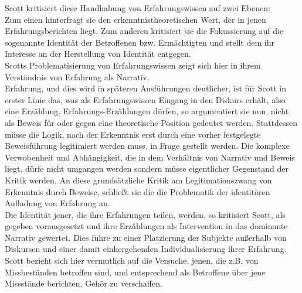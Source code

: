 \noindent Scott kritisiert diese Handhabung von Erfahrungswissen auf zwei Ebenen:\\
 Zum
einen hinterfragt sie den erkenntnistheoretischen Wert, der in jenen
Erfahrungsberichten liegt. Zum anderen kritisiert sie die Fokussierung auf die
sogenannte Identität der Betroffenen bzw. Ermächtigten und stellt dem ihr
Interesse an der Herstellung von Identität entgegen.\footnotemark{}\\
Scotts Problematisierung
von Erfahrungswissen zeigt sich hier in ihrem Verständnis von Erfahrung als
Narrativ.\\
 Erfahrung, und dies wird in späteren Ausführungen deutlicher, ist für
Scott in erster Linie das, was als Erfahrungswissen Eingang in den Diskurs
erhält, also eine Erzählung. Erfahrungs-Erzählungen dürfen, so argumentiert sie
nun, nicht als Beweis für oder gegen eine theoretische Position gedeutet
werden. Stattdessen müsse die Logik, nach der Erkenntnis erst durch eine vorher
festgelegte Beweisführung legitimiert werden muss, in Frage gestellt werden.
Die komplexe Verwobenheit und Abhängigkeit, die in dem Verhältnis von Narrativ
und Beweis liegt, dürfe nicht umgangen werden sondern müsse eigentlicher
Gegenstand der Kritik werden. An diese grundsätzliche Kritik am
Legitimationszwang von Erkenntnis durch Beweise, schließt sie die die
Problematik der identitären Aufladung von Erfahrung an.\\
Die Identität jener, die ihre Erfahrungen teilen, werden, so kritisiert Scott,
als gegeben vorausgesetzt und ihre Erzählungen als Intervention in das
dominante Narrativ gewertet. Dies führe zu einer Platzierung der Subjekte
außerhalb von Diskursen und einer damit einhergehenden Individualisierung ihrer
Erfahrung. Scott bezieht sich hier vermutlich auf die Versuche, jenen, die z.B.
von Missbeständen betroffen sind, und entsprechend als Betroffene über jene
Missstände berichten, Gehör zu verschaffen.\footnotemark{} \\

